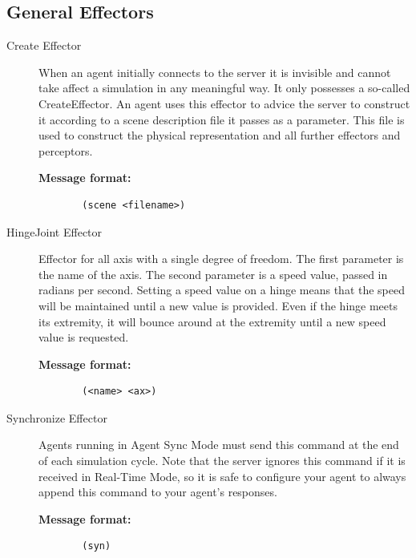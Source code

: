 \subsection{General Effectors}
\begin{description}
  \item [Create Effector]
  When an agent initially connects to the server it is invisible and cannot take affect a simulation in any meaningful way. It only possesses a so-called CreateEffector. An agent uses this effector to advice the server to construct it according to a scene description file it passes as a parameter. This file is used to construct the physical representation and all further effectors and perceptors.
  \begin{description}
  \item[{\bf Message format:}]
  \begin{verbatim}
  (scene <filename>)
  \end{verbatim}
  \end{description}

  \item [HingeJoint Effector]
  Effector for all axis with a single degree of freedom. The first parameter is the name of the axis. The second parameter is a speed value, passed in radians per second. Setting a speed value on a hinge means that the speed will be maintained until a new value is provided. Even if the hinge meets its extremity, it will bounce around at the extremity until a new speed value is requested.
  \begin{description}
  \item[{\bf Message format:}]
  \begin{verbatim}
  (<name> <ax>)
  \end{verbatim}
  \end{description}

  \item [Synchronize Effector]
  Agents running in Agent Sync Mode must send this command at the end of each simulation cycle. Note that the server ignores this command if it is received in Real-Time Mode, so it is safe to configure your agent to always append this command to your agent's responses.
  \begin{description}
  \item[{\bf Message format:}]
  \begin{verbatim}
  (syn)
  \end{verbatim}
  \end{description}

\end{description}

